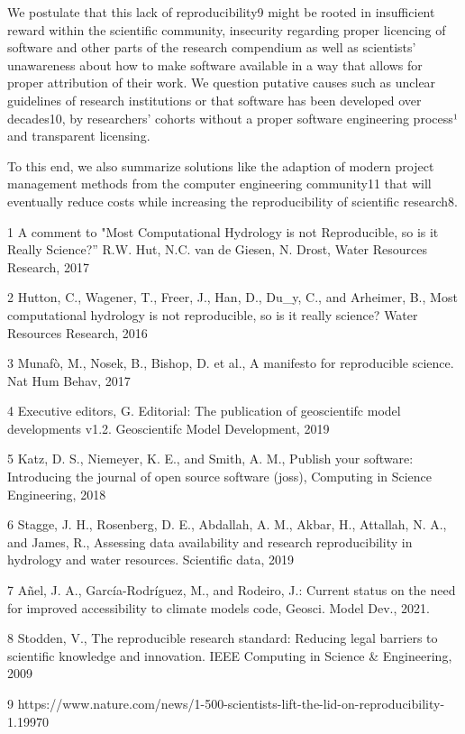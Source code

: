 \documentclass{article}
\begin{document}
We postulate that this lack of reproducibility9 might be rooted in insufficient reward within the scientific community, insecurity regarding proper licencing of software and other parts of the research compendium as well as scientists’ unawareness about how to make software available in a way that allows for proper attribution of their work. We question putative causes such as unclear guidelines of research institutions or that software has been developed over decades10, by researchers' cohorts without a proper software engineering process¹ and transparent licensing.

To this end, we also summarize solutions like the adaption of modern project management methods from the computer engineering community11 that will eventually reduce costs while increasing the reproducibility of scientific research8.

1 A comment to "Most Computational Hydrology is not Reproducible, so is it Really Science?” R.W. Hut, N.C. van de Giesen, N. Drost, Water Resources Research, 2017

2 Hutton, C., Wagener, T., Freer, J., Han, D., Du\_y, C., and Arheimer, B., Most computational hydrology is not reproducible, so is it really science? Water Resources Research, 2016

3 Munafò, M., Nosek, B., Bishop, D. et al., A manifesto for reproducible science. Nat Hum Behav, 2017

4 Executive editors, G. Editorial: The publication of geoscientifc model developments v1.2. Geoscientifc Model Development, 2019

5 Katz, D. S., Niemeyer, K. E., and Smith, A. M., Publish your software: Introducing the journal of open source software (joss), Computing in Science Engineering, 2018

6 Stagge, J. H., Rosenberg, D. E., Abdallah, A. M., Akbar, H., Attallah, N. A., and James, R., Assessing data availability and research reproducibility in hydrology and water resources. Scientific data, 2019

7 Añel, J. A., García-Rodríguez, M., and Rodeiro, J.: Current status on the need for improved accessibility to climate models code, Geosci. Model Dev., 2021.

8 Stodden, V., The reproducible research standard: Reducing legal barriers to scientific knowledge and innovation. IEEE Computing in Science \& Engineering, 2009

9 https://www.nature.com/news/1-500-scientists-lift-the-lid-on-reproducibility-1.19970
\end{document}
